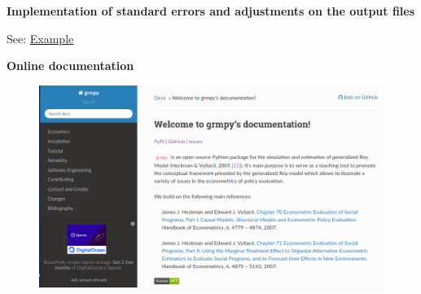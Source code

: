 \begin{frame}
\textbf{Implementation of standard errors and adjustments on the output files}
\vfill
\begin{center}
See: \href{examples/est.grmpy.info}{Example}
\end{center}
\vfill
\end{frame}

\begin{frame}
\textbf{Online documentation}
\vfill
\begin{figure}
  \includegraphics[scale=0.3]{figures/docu.png}
\end{figure}
\vfill
\end{frame}
